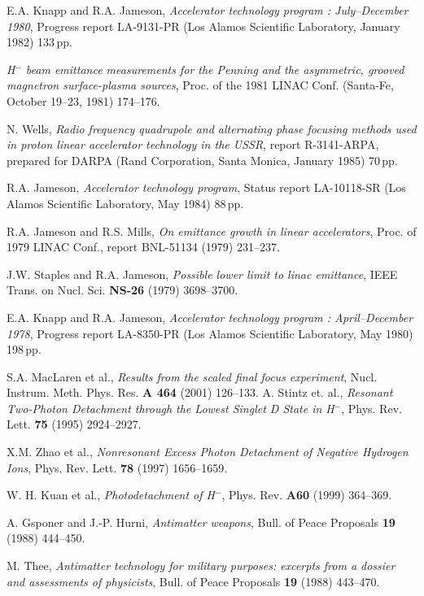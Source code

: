 \documentclass [12pt,a4paper,     ]{report} %
\begin{document}
\begin{enumerate}
 E.A. Knapp and R.A. Jameson, \emph{Accelerator technology program : July--December 1980}, Progress report LA-9131-PR (Los Alamos Scientific Laboratory, January 1982) 133\,pp. 

 \emph{H$^-$ beam emittance measurements for the Penning and the asymmetric, grooved magnetron surface-plasma sources}, Proc. of the 1981 LINAC Conf. (Santa-Fe, October 19--23, 1981) 174--176.

 N. Wells, \emph{Radio frequency quadrupole and alternating phase focusing methods used in proton linear accelerator technology in the USSR}, report R-3141-ARPA, prepared for DARPA (Rand Corporation, Santa Monica, January 1985) 70\,pp.

 R.A. Jameson, \emph{Accelerator technology program}, Status report LA-10118-SR (Los Alamos Scientific Laboratory, May 1984) 88\,pp.

 R.A. Jameson and R.S. Mills, \emph{On emittance growth in linear accelerators}, Proc. of 1979 LINAC Conf., report BNL-51134 (1979) 231--237.

 J.W. Staples and R.A. Jameson, \emph{Possible lower limit to linac emittance}, IEEE Trans. on Nucl. Sci. {\bf NS-26} (1979) 3698--3700.

 E.A. Knapp and R.A. Jameson, \emph{Accelerator technology program : April--December 1978}, Progress report LA-8350-PR (Los Alamos Scientific Laboratory, May 1980) 198\,pp.

 S.A. MacLaren et al., \emph{Results from the scaled final focus experiment}, Nucl. Instrum. Meth. Phys. Res. {\bf A 464} (2001) 126--133.
 A. Stintz et. al., \emph{Resonant Two-Photon Detachment through the Lowest Singlet D State in H$^-$}, Phys. Rev. Lett. {\bf 75} (1995) 2924--2927.

 X.M. Zhao et al., \emph{Nonresonant Excess Photon Detachment of Negative Hydrogen Ions}, Phys. Rev. Lett. {\bf 78} (1997) 1656--1659.

 W. H. Kuan et al., \emph{Photodetachment of H$^-$}, Phys. Rev. {\bf A60} (1999) 364--369.

   A. Gsponer and J.-P. Hurni, \emph{Antimatter weapons},  Bull. of Peace Proposals {\bf 19}  (1988) 444--450.

 M. Thee, \emph{Antimatter technology for military purposes: excerpts from a dossier and assessments of physicists}, Bull. of Peace Proposals {\bf 19} (1988) 443--470.


\end{enumerate}
\end{document}
